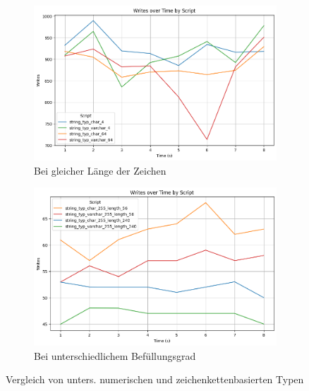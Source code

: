 \begin{figure}[H]
\begin{subfigure}[t]{0.48\textwidth}
        \centering
        \includegraphics[width=\textwidth]{PNGs/Script/Data_Types/Smaller/string-type/Writes}
        \caption{Bei gleicher Länge der Zeichen}
        \label{fig:data-types-smaller-string-type-writes}
    \end{subfigure}
    \hfill
    \begin{subfigure}[t]{0.48\textwidth}
        \centering
        \includegraphics[width=\textwidth]{PNGs/Script/Data_Types/Smaller/string-type-length/Writes}
        \caption{Bei unterschiedlichem Befüllungsgrad}
        \label{fig:data-types-smaller-string-type-length-writes}
    \end{subfigure}
    \caption[Datentypen: Numerische und zeichenkettenbasierte Typen]{Vergleich von unters. numerischen und zeichenkettenbasierten Typen}
\end{figure}
\vspace{-20pt}


